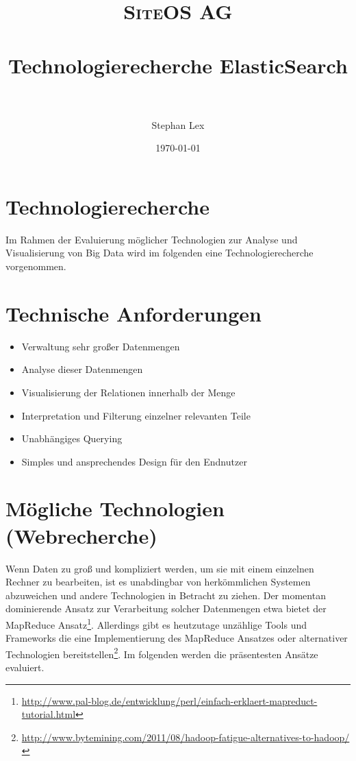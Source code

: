 \documentclass[paper=a4, fontsize=11pt]{scrartcl}
\title{	
\normalfont \normalsize 
\textsc{SiteOS AG} \\ [10pt] %
\horrule{0.5pt} \\[0.4cm] %
\huge Technologierecherche ElasticSearch \\ %
\horrule{2pt} \\[0.5cm] %
}
\author{Stephan Lex} %
\date{\normalsize\today} %
\begin{document}
\maketitle %



\section*{Technologierecherche}
Im Rahmen der Evaluierung m\"oglicher Technologien zur Analyse und Visualisierung von Big Data wird im folgenden eine Technologierecherche vorgenommen.
\section{Technische Anforderungen}
\begin{itemize}
\item Verwaltung sehr gro\ss{}er Datenmengen
\item Analyse dieser Datenmengen
\item Visualisierung der Relationen innerhalb der Menge 
\item Interpretation und Filterung einzelner relevanten Teile
\item Unabh\"angiges Querying
\item Simples und ansprechendes Design f\"ur den Endnutzer
\end{itemize}

\section{M\"ogliche Technologien (Webrecherche)}
Wenn Daten zu gro\ss{} und kompliziert werden, um sie mit einem einzelnen Rechner zu bearbeiten, ist es unabdingbar von herk\"ommlichen Systemen abzuweichen und andere Technologien in Betracht zu ziehen. Der momentan dominierende Ansatz zur Verarbeitung solcher Datenmengen etwa bietet der MapReduce Ansatz\footnote{\url{http://www.pal-blog.de/entwicklung/perl/einfach-erklaert-mapreduct-tutorial.html}}.
Allerdings gibt es heutzutage unz\"ahlige Tools und Frameworks die eine Implementierung des MapReduce Ansatzes oder alternativer Technologien bereitstellen\footnote{\url{http://www.bytemining.com/2011/08/hadoop-fatigue-alternatives-to-hadoop/}}.
Im folgenden werden die pr\"asentesten Ans\"atze evaluiert.\\
\end{document}
